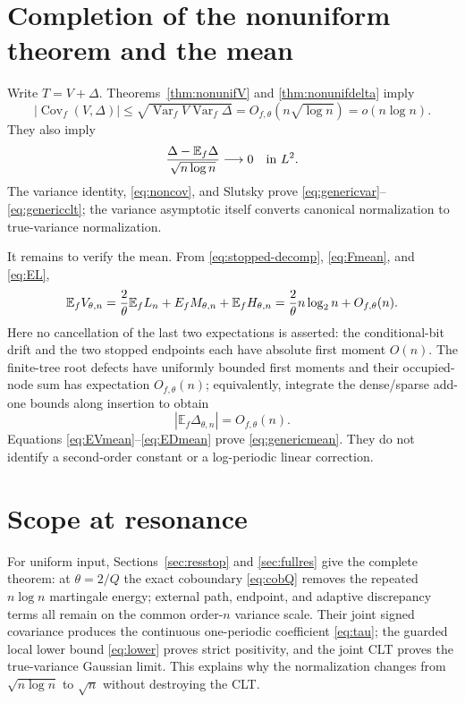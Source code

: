 \documentclass[11pt]{article}
\numberwithin{equation}{section}
\theoremstyle{definition}\newtheorem{definition}[theorem]{Definition}
\theoremstyle{remark}\newtheorem{remark}[theorem]{Remark}
\newcommand{\E}{\mathbb E}\newcommand{\Pp}{\mathbb P}
\newcommand{\Var}{\operatorname {Var}}\newcommand{\Cov}{\operatorname {Cov}}
\newcommand{\1}{\mathbf 1}\newcommand{\cD}{\mathcal D}
\begin{document}
\clearpage
\section{Completion of the nonuniform theorem and the mean}\label{sec:nonuniformfull}
Write $T=V+\Delta$.  Theorems~\ref{thm:nonunifV} and
\ref{thm:nonunifdelta} imply
\begin{equation}
 |\Cov_f(V,\Delta)|\le\sqrt{\Var_fV\Var_f\Delta}
 =O_{f,\theta}(n\sqrt{\log n})=o(n\log n).                \label{eq:noncov}
\end{equation}
They also imply
\begin{equation}{\Delta-\E_f\Delta\over\sqrt{n\log n}}
 \longrightarrow0\quad\hbox{in }L^2.                       \label{eq:nonDsmall}
\end{equation}
The variance identity, \eqref{eq:noncov}, and Slutsky prove
\eqref{eq:genericvar}--\eqref{eq:genericclt}; the variance asymptotic itself
converts canonical normalization to true-variance normalization.

It remains to verify the mean.  From \eqref{eq:stopped-decomp},
\eqref{eq:Fmean}, and \eqref{eq:EL},
\begin{equation}
 \E_fV_{\theta,n}={2\over\theta}\E_fL_n+E_fM_{\theta,n}
 +\E_fH_{\theta,n}={2\over\theta}n\log_2n+O_{f,\theta}(n).
                                                               \label{eq:EVmean}
\end{equation}
Here no cancellation of the last two expectations is asserted: the
conditional-bit drift and the two stopped endpoints each have absolute
first moment $O(n)$.  The finite-tree root defects have uniformly bounded
first moments and their occupied-node sum has expectation $O_{f,\theta}(n)$;
equivalently, integrate the dense/sparse add-one bounds along insertion to
obtain
\begin{equation}|\E_f\Delta_{\theta,n}|=O_{f,\theta}(n).    \label{eq:EDmean}
\end{equation}
Equations \eqref{eq:EVmean}--\eqref{eq:EDmean} prove
\eqref{eq:genericmean}.  They do not identify a second-order constant or a
log-periodic linear correction.

\clearpage
\section{Scope at resonance}\label{sec:scope}
For uniform input, Sections~\ref{sec:resstop} and \ref{sec:fullres} give the
complete theorem: at $\theta=2/Q$ the exact coboundary
\eqref{eq:cobQ} removes the repeated $n\log n$ martingale energy; external
path, endpoint, and adaptive discrepancy terms all remain on the common
order-$n$ variance scale.  Their joint signed covariance produces the
continuous one-periodic coefficient \eqref{eq:tau}; the guarded local
lower bound \eqref{eq:lower} proves strict positivity, and the joint CLT
proves the true-variance Gaussian limit.  This explains why the
normalization changes from $\sqrt{n\log n}$ to $\sqrt n$ without destroying
the CLT.
\end{document}
